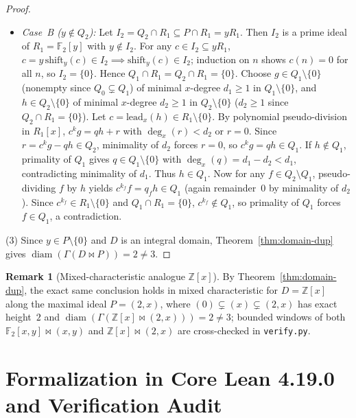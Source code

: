 \documentclass[11pt]{article}
\theoremstyle{definition}
\newtheorem{remark}[theorem]{Remark}
\newcommand{\diam}{\operatorname{diam}}
\newcommand{\FF}{\mathbb{F}}
\newcommand{\ZZ}{\mathbb{Z}}
\begin{document}
\begin{proof}
\begin{itemize}
  \item \emph{Case~B ($y \notin Q_2$):} Let $I_2 = Q_2 \cap R_1 \subseteq P \cap R_1 = y R_1$.
  Then $I_2$ is a prime ideal of $R_1 = \FF_2[y]$ with $y \notin I_2$. For any
  $c \in I_2 \subseteq y R_1$, $c = y\,\mathrm{shift}_y(c) \in I_2 \implies \mathrm{shift}_y(c) \in I_2$;
  induction on $n$ shows $c(n) = 0$ for all $n$, so $I_2 = \{0\}$. Hence
  $Q_1 \cap R_1 = Q_2 \cap R_1 = \{0\}$. Choose $g \in Q_1 \setminus \{0\}$ (nonempty
  since $Q_0 \subsetneq Q_1$) of minimal $x$-degree $d_1 \ge 1$ in $Q_1 \setminus \{0\}$,
  and $h \in Q_2 \setminus \{0\}$ of minimal $x$-degree $d_2 \ge 1$ in $Q_2 \setminus \{0\}$
  ($d_2 \ge 1$ since $Q_2 \cap R_1 = \{0\}$). Let $c = \mathrm{lead}_x(h) \in R_1 \setminus \{0\}$.
  By polynomial pseudo-division in $R_1[x]$, $c^k g = q h + r$ with $\deg_x(r) < d_2$ or
  $r = 0$. Since $r = c^k g - q h \in Q_2$, minimality of $d_2$ forces $r = 0$, so
  $c^k g = q h \in Q_1$. If $h \notin Q_1$, primality of $Q_1$ gives $q \in Q_1 \setminus \{0\}$
  with $\deg_x(q) = d_1 - d_2 < d_1$, contradicting minimality of $d_1$. Thus $h \in Q_1$.
  Now for any $f \in Q_2 \setminus Q_1$, pseudo-dividing $f$ by $h$ yields $c^{k_f} f = q_f h \in Q_1$
  (again remainder~$0$ by minimality of $d_2$). Since $c^{k_f} \in R_1 \setminus \{0\}$
  and $Q_1 \cap R_1 = \{0\}$, $c^{k_f} \notin Q_1$, so primality of $Q_1$ forces
  $f \in Q_1$, a contradiction.
\end{itemize}

(3) Since $y \in P \setminus \{0\}$ and $D$ is an integral domain, Theorem~\ref{thm:domain-dup}
gives $\diam(\Gamma(D \bowtie P)) = 2 \neq 3$.
\end{proof}

\begin{remark}[Mixed-characteristic analogue {$\ZZ[x]$}]
By Theorem~\ref{thm:domain-dup}, the exact same conclusion holds in mixed characteristic
for $D = \ZZ[x]$ along the maximal ideal $P = (2, x)$, where $(0) \subsetneq (x) \subsetneq (2, x)$
has exact height~$2$ and $\diam(\Gamma(\ZZ[x] \bowtie (2, x))) = 2 \neq 3$; bounded
windows of both $\FF_2[x, y] \bowtie (x, y)$ and $\ZZ[x] \bowtie (2, x)$ are cross-checked
in \texttt{verify.py}.
\end{remark}

\section{Formalization in Core Lean 4.19.0 and Verification Audit}
\end{document}
